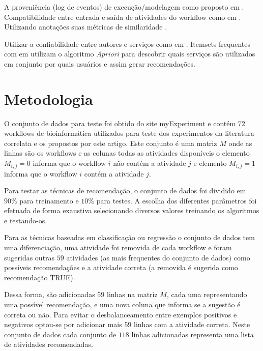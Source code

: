 \documentclass{acm_proc_article-sp}
\begin{document}
A proveni{\^e}ncia (log de eventos) de execu\c{c}{\~a}o/modelagem como proposto em \cite{Shao2007, Shao2009, OLIVEIRA2008, Koop2008, Garijo2013, Yeo2013}. Compatibilidade entre entrada e sa{\'i}da de atividades do workflow como em \cite{Zhang35, Ayadi2007, Zhang2006}. Utilizando anota\c{c}{\~o}es suas m{\'e}tricas de similaridade \cite{Oliveira2009, Zhang2013}.

Utilizar a confiabilidade entre autores e servi\c{c}os como em \cite{ReputationNet22}. Itemsets frequentes com em \cite{Tan2011, Wang2009} utilizam o algoritmo \emph{Apriori} para descobrir quais servi\c{c}os s{\~a}o utilizados em conjunto por quais usu{\'a}rios e assim gerar recomenda\c{c}{\~o}es.

\section{Metodologia}\label{METODOLOGIA}
O conjunto de dados para teste foi obtido do site myExperiment \cite{ROURE2015} e cont{\'e}m \(72\) workflows de bioinform{\'a}tica utilizados para teste dos experimentos da literatura correlata e os propostos por este artigo. Este conjunto {\'e} uma matriz \(M\) onde as linhas s{\~a}o os workflows e as colunas todas as atividades dispon{\'i}veis o elemento \(M_{i,j} = 0\) informa que o workflow \(i\) n{\~a}o cont{\'e}m a atividade \(j\) e elemento \(M_{i,j} = 1\) informa que o workflow \(i\) cont{\'e}m a atividade \(j\).

Para testar as t{\'e}cnicas de recomenda\c{c}{\~a}o, o conjunto de dados foi dividido em \(90\%\) para treinamento e \(10\%\) para testes. A escolha dos diferentes par{\^a}metros foi efetuada de forma exaustiva selecionando diversos valores treinando os algoritmos e testando-os.

Para as t{\'e}cnicas baseadas em classifica\c{c}{\~a}o ou regress{\~a}o o conjunto de dados tem uma diferencia\c{c}{\~a}o, uma 
atividade foi removida de cada workflow e foram sugeridas outras \(59\) atividades (as mais frequentes do conjunto de dados) como poss{\'i}veis recomenda\c{c}{\~o}es e a atividade correta (a removida {\'e} sugerida como recomenda\c{c}{\~a}o TRUE). 

Dessa forma, s{\~a}o adicionadas \(59\) linhas na matriz \(M\), cada uma representando uma poss{\'i}vel recomenda\c{c}{\~a}o, e uma nova coluna que informa se a sugest{\~a}o {\'e} correta ou n{\~a}o. Para evitar o desbalanceamento entre exemplos positivos e negativos optou-se por adicionar mais \(59\) linhas com a atividade correta. Neste conjunto de dados cada conjunto de \(118\) linhas adicionadas representa uma lista de atividades recomendadas.
\end{document}
